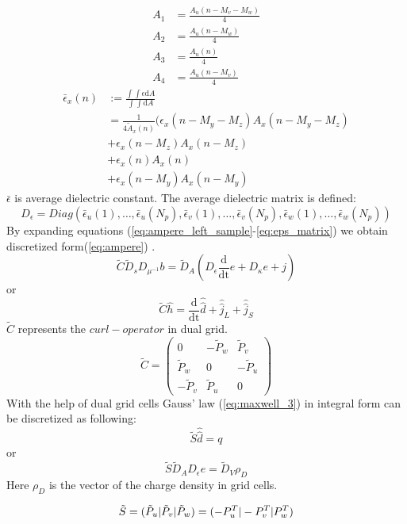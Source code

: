 \begin{align}
A_{1}&=\frac{A_{u}(n-M_{v}-M_{w})}{4}\\
A_{2}&=\frac{A_{u}(n-M_{w})}{4}\\
A_{3}&=\frac{A_{u}(n)}{4}\\
A_{4}&=\frac{A_{u}(n-M_{v})}{4}
\end{align}
\begin{align}
\bar{\epsilon}_{x}(n)&:=\frac{\int\int\epsilon\mathrm{d}A}{\int\int\mathrm{d}A}\nonumber\\
&=\frac{1}{4\tilde{A}_{x}(n)}(\epsilon_{x}(n-M_{y}-M_{z})A_{x}(n-M_{y}-M_{z})\nonumber\\
&+\epsilon_{x}(n-M_{z})A_{x}(n-M_{z}) \nonumber\\
&+\epsilon_{x}(n)A_{x}(n) \nonumber\\
&+\epsilon_{x}(n-M_{y})A_{x}(n-M_{y})
\end{align}
$\bar{\epsilon}$ is average dielectric constant. 
The average dielectric matrix is defined:
\begin{equation}
D_{\epsilon}=Diag(\bar{\epsilon}_{u}(1),\ldots,\bar{\epsilon}_{u}(N_{p}),\bar{\epsilon}_{v}(1),\ldots,\bar{\epsilon}_{v}(N_{p}),\bar{\epsilon}_{w}(1),\ldots,\bar{\epsilon}_{w}(N_{p}))
\label{eq:eps_matrix}
\end{equation}
By expanding equations (\ref{eq:ampere_left_sample}-\ref{eq:eps_matrix}) we obtain discretized form(\ref{eq:ampere}) .
\begin{equation}
\tilde{C}\tilde{D}_{s}D_{\mu^{-1}}b=\tilde{D}_{A}(D_{\epsilon}\frac{\mathrm{d}}{\mathrm{dt}}e+D_{\kappa}e+j)
\label{eq:ampere}
\end{equation}
or
\begin{equation}
\tilde{C}\widehat{h}=\frac{\mathrm{d}}{\mathrm{dt}}\widehat{\widehat{d}}+\widehat{\widehat{j}}_{L}+\widehat{\widehat{j}}_{S}
\label{eq:ampere_sample}
\end{equation}
$\tilde{C}$ represents the $curl-operator$ in dual grid.
\begin{equation}
\tilde{C}=
	\begin{pmatrix}
	0&-\tilde{P}_{w}&\tilde{P}_{v}\\
	\tilde{P}_{w}&0&-\tilde{P}_{u}\\
	-\tilde{P}_{v}&\tilde{P}_{u}&0
	\end{pmatrix}
	\label{eq:dual_C_matrix}
\end{equation}
With the help of dual grid cells Gauss' law (\ref{eq:maxwell_3}) in integral form can be discretized\cite{script_FeldSim} as following:
\begin{equation}
\tilde{S}\widehat{\widehat{d}}=q
\label{eq:gausslaw}
\end{equation}
or
\begin{equation}
\tilde{S}\tilde{D}_{A}D_{\epsilon}e=\tilde{D}_{V}\rho_{D}
\label{eq:gausslaw_sample}
\end{equation}
Here $\rho_{D}$ is the vector of the charge density in grid cells.

\begin{equation}
\tilde{S}=(\tilde{P}_{u}|\tilde{P}_{v}|\tilde{P}_{w})=(-P_{u}^{T}|-P_{v}^{T}|\-P_{w}^{T})
\label{eq:dual_S_matrix}
\end{equation}
